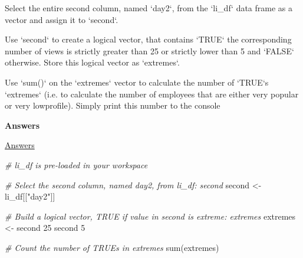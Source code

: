 \documentclass[]{article}
\newcommand{\hlnum}[1]{\textcolor[rgb]{0.816,0.125,0.439}{#1}}%
\newcommand{\hlstr}[1]{\textcolor[rgb]{0.251,0.627,0.251}{#1}}%
\newcommand{\hlcom}[1]{\textcolor[rgb]{0.502,0.502,0.502}{\textit{#1}}}%
\newcommand{\hlstd}[1]{\textcolor[rgb]{0.251,0.251,0.251}{#1}}%
\newcommand{\hlkwc}[1]{\textcolor[rgb]{0.251,0.251,0.251}{#1}}%
\newcommand{\hlkwd}[1]{\textcolor[rgb]{0.878,0.439,0.125}{#1}}%
\newenvironment{Shaded}{\begin{myshaded}}{\end{myshaded}}
\newcommand{\KeywordTok}[1]{\hlkwd{#1}}
\newcommand{\DataTypeTok}[1]{\hlkwc{#1}}
\newcommand{\DecValTok}[1]{\hlnum{#1}}
\newcommand{\StringTok}[1]{\hlstr{#1}}
\newcommand{\CommentTok}[1]{\hlcom{#1}}
\newcommand{\NormalTok}[1]{\hlstd{#1}}
\begin{document}
\begin{Shaded}
\begin{Highlighting}[]
\OperatorTok{*}\StringTok{ }\NormalTok{Select the entire second column, named }\StringTok{`}\DataTypeTok{day2}\StringTok{`}\NormalTok{, from the }\StringTok{`}\DataTypeTok{li_df}\StringTok{`}\NormalTok{ data frame as a vector and assign it to }\StringTok{`}\DataTypeTok{second}\StringTok{`}\NormalTok{.}

\OperatorTok{*}\StringTok{ }\NormalTok{Use }\StringTok{`}\DataTypeTok{second}\StringTok{`}\NormalTok{ to create a logical vector, that contains }\StringTok{`}\DataTypeTok{TRUE}\StringTok{`} \NormalTok{ the corresponding number of views is strictly greater than }\DecValTok{25}\NormalTok{ or strictly lower than }\DecValTok{5}\NormalTok{ and }\StringTok{`}\DataTypeTok{FALSE}\StringTok{`}\NormalTok{ otherwise. Store this logical vector as }\StringTok{`}\DataTypeTok{extremes}\StringTok{`}\NormalTok{.}

\OperatorTok{*}\StringTok{ }\NormalTok{Use }\StringTok{`}\DataTypeTok{sum()}\StringTok{`}\NormalTok{ on the }\StringTok{`}\DataTypeTok{extremes}\StringTok{`}\NormalTok{ vector to calculate the number of }\StringTok{`}\DataTypeTok{TRUE}\StringTok{`}\NormalTok{s } \StringTok{`}\DataTypeTok{extremes}\StringTok{`}\NormalTok{ (i.e. to calculate the number of employees that are either very popular or very low}\OperatorTok{-}\NormalTok{profile). Simply print this number to the console}
\end{Highlighting}
\end{Shaded}

\textbf{Answers}

\href{https://campus.datacamp.com/courses/intermediate-r/chapter-1-conditionals-and-control-flow?ex=10}{Answers}

\begin{Shaded}
\begin{Highlighting}[]
\CommentTok{# li_df is pre-loaded in your workspace}

\CommentTok{# Select the second column, named day2, from li_df: second}
\NormalTok{second <-}\StringTok{ }\NormalTok{li_df[[}\StringTok{"day2"}\NormalTok{]]}

\CommentTok{# Build a logical vector, TRUE if value in second is extreme: extremes}
\NormalTok{extremes <-}\StringTok{ }\NormalTok{second }\OperatorTok{>}\StringTok{ }\DecValTok{25} \OperatorTok{|}\StringTok{ }\NormalTok{second }\OperatorTok{<}\StringTok{ }\DecValTok{5}

\CommentTok{# Count the number of TRUEs in extremes}
\KeywordTok{sum}\NormalTok{(extremes)}
\end{Highlighting}
\end{Shaded}
\end{document}
